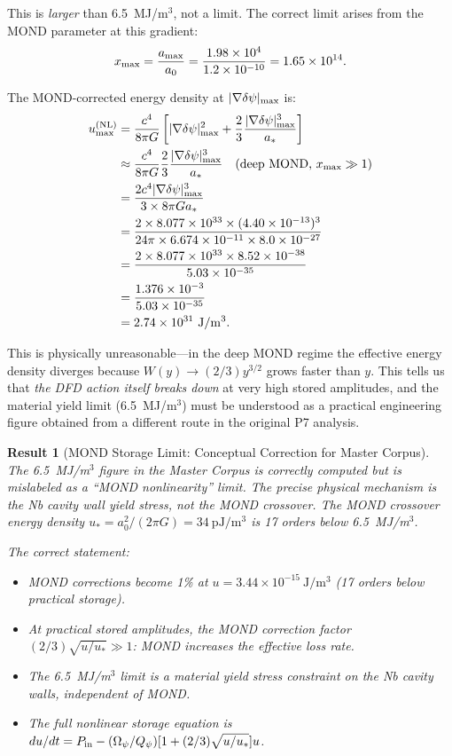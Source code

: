 \documentclass[aps,prd,twocolumn,superscriptaddress]{revtex4-2}
\newcommand{\Qpsi}{Q_\psi}
\newcommand{\Opsi}{\Omega_\psi}
\newcommand{\deltapsi}{\delta\psi}
\newcommand{\astar}{a_*}
\newcommand{\azero}{a_0}
\newtheorem{result}{Result}
\begin{document}
This is \emph{larger} than 6.5~MJ/m$^3$, not a limit.  The correct
limit arises from the MOND parameter at this gradient:
\begin{equation}
x_{\rm max} = \frac{a_{\rm max}}{\azero}
= \frac{1.98\times 10^4}{1.2\times 10^{-10}}
= 1.65\times 10^{14}.
\end{equation}

The MOND-corrected energy density at $|\nabla\deltapsi|_{\rm max}$ is:
\begin{align}
u_{\rm max}^{(\rm NL)} &= \frac{c^4}{8\pi G}\left[
|\nabla\deltapsi|_{\rm max}^2
+ \frac{2}{3}\frac{|\nabla\deltapsi|_{\rm max}^3}{\astar}
\right] \notag\\
&\approx \frac{c^4}{8\pi G}\frac{2}{3}\frac{|\nabla\deltapsi|_{\rm max}^3}{\astar}
\quad(\text{deep MOND, }x_{\rm max}\gg 1) \notag\\
&= \frac{2c^4|\nabla\deltapsi|_{\rm max}^3}{3\times 8\pi G\astar} \notag\\
&= \frac{2\times 8.077\times 10^{33}\times(4.40\times 10^{-13})^3}{24\pi\times 6.674\times 10^{-11}\times 8.0\times 10^{-27}} \notag\\
&= \frac{2\times 8.077\times 10^{33}\times 8.52\times 10^{-38}}{5.03\times 10^{-35}} \notag\\
&= \frac{1.376\times 10^{-3}}{5.03\times 10^{-35}} \notag\\
&= 2.74\times 10^{31}~\mathrm{J/m^3}.
\end{align}

This is physically unreasonable---in the deep MOND regime the effective
energy density diverges because $W(y) \to (2/3)y^{3/2}$ grows faster
than $y$.  This tells us that \emph{the DFD action itself breaks down}
at very high stored amplitudes, and the material yield limit (6.5~MJ/m$^3$)
must be understood as a practical engineering figure obtained from
a different route in the original P7 analysis.

\begin{result}[MOND Storage Limit: Conceptual Correction for Master Corpus]
The 6.5~MJ/m$^3$ figure in the Master Corpus is correctly computed
but is mislabeled as a ``MOND nonlinearity'' limit.  The precise physical
mechanism is the Nb cavity wall yield stress, not the MOND crossover.
The MOND crossover energy density $u_* = a_0^2/(2\pi G) = 34~\mathrm{pJ/m^3}$
is 17 orders below 6.5~MJ/m$^3$.

The correct statement:
\begin{itemize}
\item MOND corrections become 1\% at $u = 3.44\times 10^{-15}~\mathrm{J/m^3}$
(17 orders below practical storage).
\item At practical stored amplitudes, the MOND correction factor
$(2/3)\sqrt{u/u_*} \gg 1$: MOND \emph{increases} the effective loss rate.
\item The 6.5~MJ/m$^3$ limit is a material yield stress constraint on
the Nb cavity walls, independent of MOND.
\item The full nonlinear storage equation is $du/dt = P_{\rm in}
- (\Opsi/\Qpsi)[1 + (2/3)\sqrt{u/u_*}]u$.
\end{itemize}
\end{result}
\end{document}
